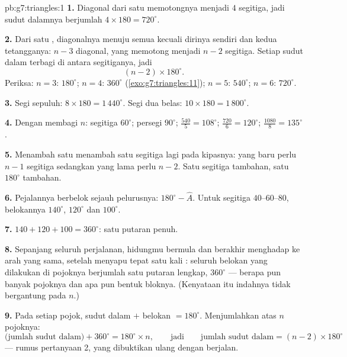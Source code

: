 \begin{solution}{pb:g7:triangles:1}
\textbf{1.} Diagonal dari satu   memotongnya
menjadi $4$ segitiga, jadi sudut dalamnya berjumlah
$4 \times 180 = 720^\circ$.

\textbf{2.} Dari satu , diagonalnya menuju semua  kecuali dirinya sendiri dan kedua tetangganya: $n - 3$ diagonal,
yang memotong  menjadi $n - 2$ segitiga. Setiap sudut
dalam  terbagi di antara segitiganya, jadi 
\[
(n - 2) \times 180^\circ .
\]
Periksa: $n = 3$: $180^\circ$; $n = 4$: $360^\circ$
(\cref{exo:g7:triangles:11}); $n = 5$: $540^\circ$; $n = 6$:
$720^\circ$.

\textbf{3.} Segi sepuluh: $8 \times 180 = 1\,440^\circ$. Segi dua
belas: $10 \times 180 = 1\,800^\circ$.

\textbf{4.} Dengan membagi $n$: segitiga $60^\circ$; persegi
$90^\circ$;  $\frac{540}{5} = 108^\circ$; 
$\frac{720}{6} = 120^\circ$;  $\frac{1080}{8} =
135^\circ$.

\textbf{5.} Menambah satu  menambah satu segitiga lagi pada
kipasnya:  yang baru perlu $n - 1$ segitiga sedangkan yang
lama perlu $n - 2$. Satu segitiga tambahan, satu $180^\circ$ tambahan.

\textbf{6.} Pejalannya berbelok sejauh pelurusnya:
$180^\circ - \widehat A$. Untuk segitiga $40$--$60$--$80$, belokannya
$140^\circ$, $120^\circ$ dan $100^\circ$.

\textbf{7.} $140 + 120 + 100 = 360^\circ$: satu putaran penuh.

\textbf{8.} Sepanjang seluruh perjalanan, hidungmu bermula dan
berakhir menghadap ke arah yang sama, setelah menyapu tepat satu kali
: seluruh belokan yang dilakukan di pojoknya berjumlah satu
putaran lengkap, $360^\circ$ --- berapa pun banyak pojoknya dan apa
pun bentuk bloknya. (Kenyataan itu indahnya tidak bergantung pada
$n$.)

\textbf{9.} Pada setiap pojok, sudut dalam $+$ belokan $= 180^\circ$.
Menjumlahkan atas $n$ pojoknya:
\[
\text{(jumlah sudut dalam)} + 360^\circ = 180^\circ \times n,
\qquad\text{jadi}\qquad
\text{jumlah sudut dalam} = (n - 2) \times 180^\circ
\]
--- rumus pertanyaan 2, yang dibuktikan ulang dengan berjalan.


\end{solution}
